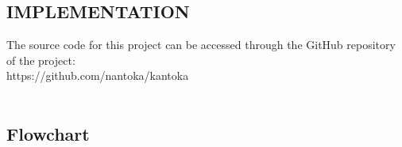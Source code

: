 \documentclass[report.tex]{subfiles}
\begin{document}
\begin{large}
\section{IMPLEMENTATION}
The source code for this project can be accessed through the GitHub repository of the project:\\
https://github.com/nantoka/kantoka\\\\
    \subsection{Flowchart}
\end{large}
\end{document}
